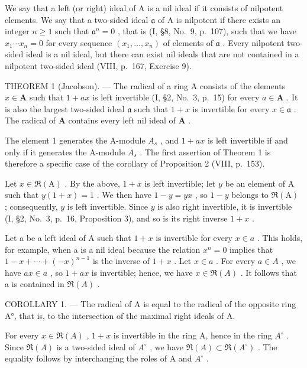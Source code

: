 We say that a left (or right) ideal of A is a nil ideal if it consists of nilpotent elements. We say that a two-sided ideal \(\mathfrak{a}\) of A is nilpotent if there exists an integer \(n \geqslant 1\) such that \(\mathfrak{a}^n = 0\) , that is (I, §8, No.~9, p.~107), such that we have \(x_1 \cdots x_n = 0\) for every sequence \((x_1, \ldots, x_n)\) of elements of \(\mathfrak{a}\) . Every nilpotent two-sided ideal is a nil ideal, but there can exist nil ideals that are not contained in a nilpotent two-sided ideal (VIII, p.~167, Exercise 9).

THEOREM 1 (Jacobson). --- The radical of a ring A consists of the elements \(x \in \mathbf{A}\) such that \(1 + ax\) is left invertible (I, §2, No.~3, p.~15) for every \(a \in \mathbf{A}\) . It is also the largest two-sided ideal \(\mathfrak{a}\) such that \(1 + x\) is invertible for every \(x \in \mathfrak{a}\) . The radical of \(\mathbf{A}\) contains every left nil ideal of \(\mathbf{A}\) .

The element 1 generates the A-module \(A_{s}\) , and \(1 + ax\) is left invertible if and only if it generates the A-module \(A_{s}\) . The first assertion of Theorem 1 is therefore a specific case of the corollary of Proposition 2 (VIII, p.~153).

Let \(x \in \Re(\mathrm{A})\) . By the above, \(1 + x\) is left invertible; let \(y\) be an element of \(\mathrm{A}\) such that \(y(1 + x) = 1\) . We then have \(1 - y = yx\) , so \(1 - y\) belongs to \(\Re(\mathrm{A})\) ; consequently, \(y\) is left invertible. Since \(y\) is also right invertible, it is invertible (I, §2, No.~3, p.~16, Proposition 3), and so is its right inverse \(1 + x\) .

Let a be a left ideal of A such that \(1 + x\) is invertible for every \(x \in a\) . This holds, for example, when a is a nil ideal because the relation \(x^{n} = 0\) implies that \(1 - x + \cdots + (-x)^{n-1}\) is the inverse of \(1 + x\) . Let \(x \in a\) . For every \(a \in A\) , we have \(ax \in a\) , so \(1 + ax\) is invertible; hence, we have \(x \in \Re(A)\) . It follows that a is contained in \(\Re(A)\) .

COROLLARY 1. --- The radical of A is equal to the radical of the opposite ring A°, that is, to the intersection of the maximal right ideals of A.

For every \(x \in \Re(A)\) , \(1 + x\) is invertible in the ring A, hence in the ring \(A^{\circ}\) . Since \(\Re(A)\) is a two-sided ideal of \(A^{\circ}\) , we have \(\Re(A) \subset \Re(A^{\circ})\) . The equality follows by interchanging the roles of A and \(A^{\circ}\) .

